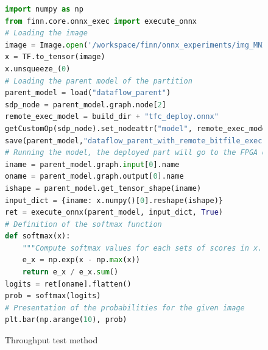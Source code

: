 \begin{figure}[htbp]
\centering
\begin{lstlisting}[language=Python]
import numpy as np
from finn.core.onnx_exec import execute_onnx
# Loading the image
image = Image.open('/workspace/finn/onnx_experiments/img_MNIST_grayscale.png')
x = TF.to_tensor(image)
x.unsqueeze_(0)
# Loading the parent model of the partition
parent_model = load("dataflow_parent")
sdp_node = parent_model.graph.node[2]
remote_exec_model = build_dir + "tfc_deploy.onnx"
getCustomOp(sdp_node).set_nodeattr("model", remote_exec_model)
save(parent_model,"dataflow_parent_with_remote_bitfile_exec")
# Running the model, the deployed part will go to the FPGA once the node is reached
iname = parent_model.graph.input[0].name
oname = parent_model.graph.output[0].name
ishape = parent_model.get_tensor_shape(iname)
input_dict = {iname: x.numpy()[0].reshape(ishape)}
ret = execute_onnx(parent_model, input_dict, True)
# Definition of the softmax function
def softmax(x):
    """Compute softmax values for each sets of scores in x."""
    e_x = np.exp(x - np.max(x))
    return e_x / e_x.sum()
logits = ret[oname].flatten()
prob = softmax(logits)
# Presentation of the probabilities for the given image
plt.bar(np.arange(10), prob)
\end{lstlisting}
\caption[Throughput Test]{Throughput test method}
  \label{fig:ThroughputTest}
\end{figure}
